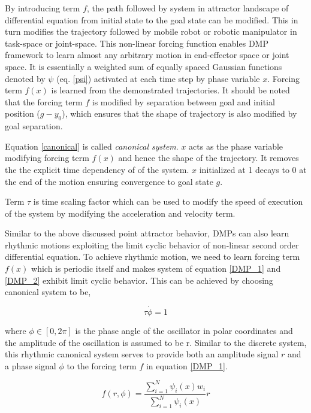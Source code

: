 By introducing term $f$, the path followed by system in attractor landscape of differential equation from initial state to the goal state can be modified. This in turn modifies the trajectory followed by mobile robot or robotic manipulator in task-space or joint-space. This non-linear forcing function enables DMP framework to learn almost any arbitrary motion in end-effector space or joint space. It is essentially a weighted sum of equally spaced Gaussian functions denoted by $\psi$ (eq. \ref{psi}) activated at each time step by phase variable $x$. Forcing term $f(x)$ is learned from the demonstrated trajectories. It should be noted that the forcing term $f$ is modified by separation between goal and initial position ($g - y_{0}$), which ensures that the shape of trajectory is also modified by goal separation.

Equation \ref{canonical} is called \textit{canonical system}. $x$ acts as the phase variable modifying forcing term $f(x)$ and hence the shape of the trajectory. It removes the the explicit time dependency of of the system. $x$ initialized at 1 decays to 0 at the end of the motion ensuring convergence to goal state $g$. 

Term $\tau$ is time scaling factor which can be used to modify the speed of execution of the system by modifying the acceleration and velocity term.  

Similar to the above discussed point attractor behavior, DMPs can also learn rhythmic motions exploiting the limit cyclic behavior of non-linear second order differential equation. To achieve rhythmic motion, we need to learn forcing term $f(x)$ which is periodic itself and makes system of equation \ref{DMP_1} and \ref{DMP_2} exhibit limit cyclic behavior. This can be achieved by choosing canonical system to be,

\begin{equation}
	\tau \dot{\phi} = 1
\end{equation}  

where $\phi \in [0, 2\pi]$ is the phase angle of the oscillator in polar coordinates and the amplitude of the oscillation is assumed to be r. Similar to the discrete system, this rhythmic canonical system serves to provide both an amplitude signal $r$ and a phase signal $\phi$ to the forcing term $f$ in equation \ref{DMP_1}.

\begin{equation}
	f(r, \phi) = \frac{\sum_{i=1}^{N}\psi_{i}(x)w_{i}}{\sum_{i=1}^{N}\psi_{i}(x)}r
\end{equation}


